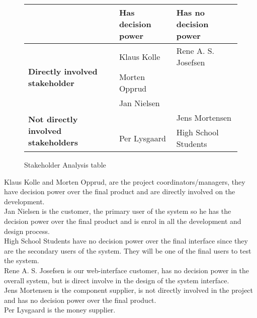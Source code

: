 \begin{figure}[h!]
 \begin{center}
  \begin{tabular}{| l | l | l |}
   \hline
    & \textbf{Has decision power} & \textbf{Has no decision power} \\ \hline
    \multirow{3}{*}{\textbf{Directly involved stakeholder}} 
    	& Klaus Kolle & Rene A. S. Josefsen\\ 
    	& Morten Opprud &  \\ 
    	& Jan Nielsen &  \\ \hline
    \multirow{2}{*}{\textbf{Not directly involved stakeholders}} 
    	&  & Jens Mortensen\\
    	& Per Lysgaard & High School Students \\ \hline
   \end{tabular}
  \end{center}
 \caption{Stakeholder Analysis table}
\end{figure}

Klaus Kolle and Morten Opprud, are the project coordinators/managers, they
have decision power over the final product and are directly involved on the
development.\\

Jan Nielsen is the customer, the primary user of the system so he has the
decision power over the final product and is enrol in all the development and design process.\\

High School Students have no decision power over the final interface since they
are the secondary users of the system. They will be one of the final users to test the system.\\

Rene A. S. Josefsen is our web-interface customer, has no decision power in the
overall system, but is direct involve in the design of the system interface.\\

Jens Mortensen is the component supplier, is not directly involved in the
project and has no decision power over the final product.\\

Per Lysgaard is the money supplier.\\
